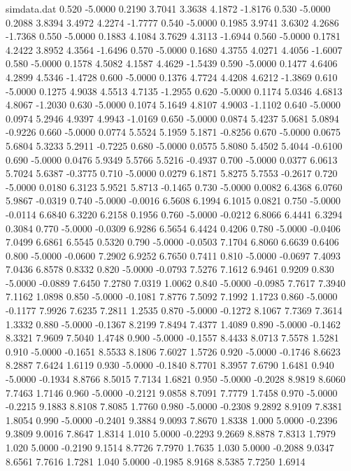 \begin{filecontents*}{simdata.dat}
0.520 -5.0000 0.2190 3.7041 3.3638 4.1872 -1.8176
0.530 -5.0000 0.2088 3.8394 3.4972 4.2274 -1.7777
0.540 -5.0000 0.1985 3.9741 3.6302 4.2686 -1.7368
0.550 -5.0000 0.1883 4.1084 3.7629 4.3113 -1.6944
0.560 -5.0000 0.1781 4.2422 3.8952 4.3564 -1.6496
0.570 -5.0000 0.1680 4.3755 4.0271 4.4056 -1.6007
0.580 -5.0000 0.1578 4.5082 4.1587 4.4629 -1.5439
0.590 -5.0000 0.1477 4.6406 4.2899 4.5346 -1.4728
0.600 -5.0000 0.1376 4.7724 4.4208 4.6212 -1.3869
0.610 -5.0000 0.1275 4.9038 4.5513 4.7135 -1.2955
0.620 -5.0000 0.1174 5.0346 4.6813 4.8067 -1.2030
0.630 -5.0000 0.1074 5.1649 4.8107 4.9003 -1.1102
0.640 -5.0000 0.0974 5.2946 4.9397 4.9943 -1.0169
0.650 -5.0000 0.0874 5.4237 5.0681 5.0894 -0.9226
0.660 -5.0000 0.0774 5.5524 5.1959 5.1871 -0.8256
0.670 -5.0000 0.0675 5.6804 5.3233 5.2911 -0.7225
0.680 -5.0000 0.0575 5.8080 5.4502 5.4044 -0.6100
0.690 -5.0000 0.0476 5.9349 5.5766 5.5216 -0.4937
0.700 -5.0000 0.0377 6.0613 5.7024 5.6387 -0.3775
0.710 -5.0000 0.0279 6.1871 5.8275 5.7553 -0.2617
0.720 -5.0000 0.0180 6.3123 5.9521 5.8713 -0.1465
0.730 -5.0000 0.0082 6.4368 6.0760 5.9867 -0.0319
0.740 -5.0000 -0.0016 6.5608 6.1994 6.1015 0.0821
0.750 -5.0000 -0.0114 6.6840 6.3220 6.2158 0.1956
0.760 -5.0000 -0.0212 6.8066 6.4441 6.3294 0.3084
0.770 -5.0000 -0.0309 6.9286 6.5654 6.4424 0.4206
0.780 -5.0000 -0.0406 7.0499 6.6861 6.5545 0.5320
0.790 -5.0000 -0.0503 7.1704 6.8060 6.6639 0.6406
0.800 -5.0000 -0.0600 7.2902 6.9252 6.7650 0.7411
0.810 -5.0000 -0.0697 7.4093 7.0436 6.8578 0.8332
0.820 -5.0000 -0.0793 7.5276 7.1612 6.9461 0.9209
0.830 -5.0000 -0.0889 7.6450 7.2780 7.0319 1.0062
0.840 -5.0000 -0.0985 7.7617 7.3940 7.1162 1.0898
0.850 -5.0000 -0.1081 7.8776 7.5092 7.1992 1.1723
0.860 -5.0000 -0.1177 7.9926 7.6235 7.2811 1.2535
0.870 -5.0000 -0.1272 8.1067 7.7369 7.3614 1.3332
0.880 -5.0000 -0.1367 8.2199 7.8494 7.4377 1.4089
0.890 -5.0000 -0.1462 8.3321 7.9609 7.5040 1.4748
0.900 -5.0000 -0.1557 8.4433 8.0713 7.5578 1.5281
0.910 -5.0000 -0.1651 8.5533 8.1806 7.6027 1.5726
0.920 -5.0000 -0.1746 8.6623 8.2887 7.6424 1.6119
0.930 -5.0000 -0.1840 8.7701 8.3957 7.6790 1.6481
0.940 -5.0000 -0.1934 8.8766 8.5015 7.7134 1.6821
0.950 -5.0000 -0.2028 8.9819 8.6060 7.7463 1.7146
0.960 -5.0000 -0.2121 9.0858 8.7091 7.7779 1.7458
0.970 -5.0000 -0.2215 9.1883 8.8108 7.8085 1.7760
0.980 -5.0000 -0.2308 9.2892 8.9109 7.8381 1.8054
0.990 -5.0000 -0.2401 9.3884 9.0093 7.8670 1.8338
1.000 5.0000 -0.2396 9.3809 9.0016 7.8647 1.8314
1.010 5.0000 -0.2293 9.2669 8.8878 7.8313 1.7979
1.020 5.0000 -0.2190 9.1514 8.7726 7.7970 1.7635
1.030 5.0000 -0.2088 9.0347 8.6561 7.7616 1.7281
1.040 5.0000 -0.1985 8.9168 8.5385 7.7250 1.6914

\end{filecontents*}
